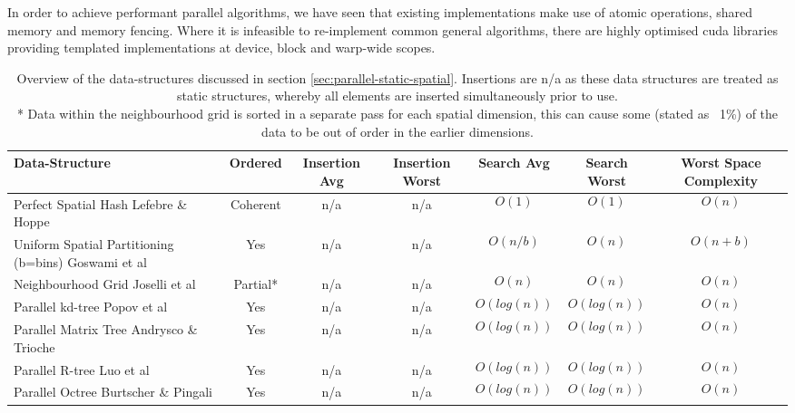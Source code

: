      In order to achieve performant parallel algorithms, we have seen that existing implementations make use of \gls{atomic} operations, shared memory and memory fencing. Where it is infeasible to re-implement common general algorithms, there are highly optimised \gls{cuda} libraries providing templated implementations at device, block and warp-wide scopes.
     
\tabulinesep=1.2mm
\begin{landscape}
\newpage
{}
\begin{table}
\begin{tabu}{|X[m,c]|c|c|c|c|c|c|}
\hline 
Data-Structure & Ordered & Insertion Avg & Insertion Worst & Search Avg & Search Worst & Worst Space Complexity\\
\hline 
Perfect Spatial Hash \linebreak Lefebre \& Hoppe \cite{LH06} & Coherent & n/a & n/a & $$O(1)$$ & $$O(1)$$ & $$O(n)$$\\
\hline
Uniform Spatial Partitioning (b=bins) \linebreak Goswami et al \cite{GS*10} & Yes & n/a & n/a & $$O(n/b)$$ & $$O(n)$$ & $$O(n+b)$$\\
\hline 
Neighbourhood Grid \linebreak Joselli et al \cite{JR*15} & Partial* & n/a & n/a & $$O(n)$$ & $$O(n)$$ & $$O(n)$$\\
\hline 
Parallel kd-tree \linebreak Popov et al \cite{PG*07} & Yes & n/a & n/a & $$O(log(n))$$ & $$O(log(n))$$ & $$O(n)$$\\
\hline 
Parallel Matrix Tree \linebreak Andrysco \& Trioche \cite{AT10} & Yes & n/a & n/a & $$O(log(n))$$ & $$O(log(n))$$ & $$O(n)$$\\
\hline 
Parallel R-tree \linebreak Luo et al \cite{LWL12} & Yes & n/a & n/a & $$O(log(n))$$ & $$O(log(n))$$ & $$O(n)$$\\
\hline 
Parallel Octree \linebreak Burtscher \& Pingali \cite{BP11} & Yes & n/a & n/a & $$O(log(n))$$ & $$O(log(n))$$ & $$O(n)$$\\
\hline 
\end{tabu}

\protect\caption[Overview of the static spatial data-structures discussed in section \ref{sec:parallel-static-spatial}.]{Overview of the data-structures discussed in section \ref{sec:parallel-static-spatial}. Insertions are n/a as these data structures are treated as static structures, whereby all elements are inserted simultaneously prior to use. \\ * Data within the neighbourhood grid is sorted in a separate pass for each spatial dimension, this can cause some (stated as ~1\%) of the data to be out of order in the earlier dimensions.\label{tab:parallel-structures}}


\end{table}
\end{landscape}